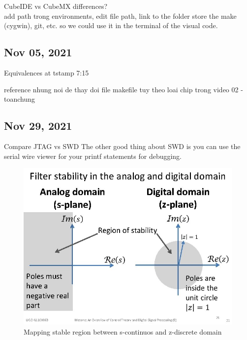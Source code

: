 \documentclass{article}
\begin{document}
CubeIDE vs CubeMX differences?
\\add path trong environments, edit file path, link to the folder store the make (cygwin), git, etc. so we could use it in the terminal of the visual code.


\subsection{Nov 05, 2021}
Equivalences at tstamp 7:15

reference nhung noi de thay doi file makefile tuy theo loai chip trong video 02 - toanchung

\subsection{Nov 29, 2021}

Compare JTAG vs SWD
The other good thing about SWD is you can use the serial wire viewer for your printf statements for debugging.
\begin{figure}[h]
  \includegraphics[scale=0.3]{control_bootcamp_stable_region_in_s_and_z_domain}
  \caption{Mapping stable region between s-continuos and z-discrete domain}  
\end{figure}
\end{document}
